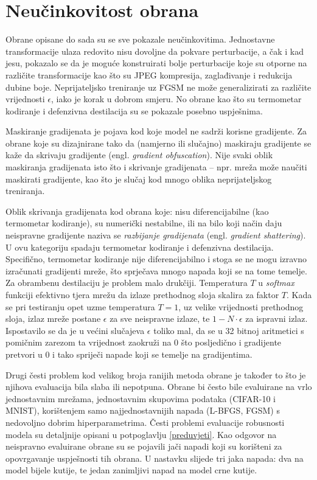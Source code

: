 \documentclass[utf8, diplomski]{fer}
\begin{document}
\section{Neučinkovitost obrana}\label{neucinkovitost}
Obrane opisane do sada su se sve pokazale neučinkovitima. Jednostavne transformacije ulaza redovito nisu dovoljne da pokvare perturbacije, a čak i kad jesu, pokazalo se da je moguće konstruirati bolje perturbacije koje su otporne na različite transformacije kao što su JPEG kompresija, zaglađivanje i redukcija dubine boje. Neprijateljsko treniranje uz FGSM ne može generalizirati za različite vrijednosti $\epsilon$, iako je korak u dobrom smjeru. No obrane kao što su termometar kodiranje i defenzivna destilacija su se pokazale posebno uspješnima. \par
Maskiranje gradijenata je pojava kod koje model ne sadrži korisne gradijente. Za obrane koje su dizajnirane tako da (namjerno ili slučajno) maskiraju gradijente se kaže da skrivaju gradijente (engl. \textit{gradient obfuscation})\citep{obfuscated}. Nije svaki oblik maskiranja gradijenata isto što i skrivanje gradijenata -- npr. mreža može naučiti maskirati gradijente, kao što je slučaj kod mnogo oblika neprijateljskog treniranja\citep{ensemble_training}. \par
Oblik skrivanja gradijenata kod obrana koje: nisu diferencijabilne (kao termometar kodiranje), su numerički nestabilne, ili na bilo koji način daju neispravne gradijente naziva se \textit{razbijanje gradijenata} (engl. \textit{gradient shattering})\citep{obfuscated}. U ovu kategoriju spadaju termometar kodiranje i defenzivna destilacija. Specifično, termometar kodiranje nije diferencijabilno i stoga se ne mogu izravno izračunati gradijenti mreže, što sprječava mnogo napada koji se na tome temelje. \\ Za obrambenu destilaciju je problem malo drukčiji. Temperatura $T$ u \textit{softmax} funkciji efektivno tjera mrežu da izlaze prethodnog sloja skalira za faktor $T$. Kada se pri testiranju opet uzme temperatura $T = 1$, uz velike vrijednosti prethodnog sloja, izlaz mreže postane $\epsilon$ za sve neispravne izlaze, te $1 - N \cdot \epsilon$ za ispravni izlaz. Ispostavilo se da je u većini slučajeva $\epsilon$ toliko mal, da se u 32 bitnoj aritmetici s pomičnim zarezom ta vrijednost zaokruži na $0$ što posljedično i gradijente pretvori u $0$ i tako spriječi napade koji se temelje na gradijentima. \par
Drugi česti problem kod velikog broja ranijih metoda obrane je također to što je njihova evaluacija bila slaba ili nepotpuna. Obrane bi često bile evaluirane na vrlo jednostavnim mrežama, jednostavnim skupovima podataka (CIFAR-10 i MNIST), korištenjem samo najjednostavnijih napada (L-BFGS, FGSM) s nedovoljno dobrim hiperparametrima. Česti problemi evaluacije robusnosti modela su detaljnije opisani u potpoglavlju \ref{preduvjeti}. Kao odgovor na neispravno evaluirane obrane su se pojavili jači napadi koji su korišteni za opovrgavanje uspješnosti tih obrana. U nastavku slijede tri jaka napada: dva na model bijele kutije, te jedan zanimljivi napad na model crne kutije.
\end{document}
